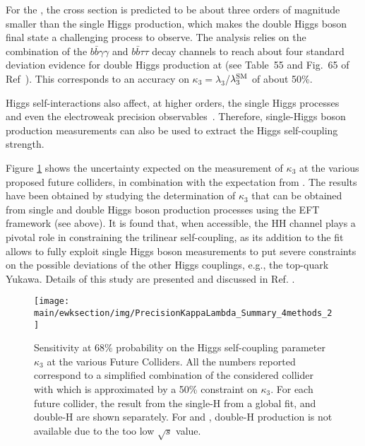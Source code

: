 \documentclass[../report.tex]{subfiles}
\providecommand{\main}{..}
\newcommand{\ew}{electroweak\xspace}
\begin{document}
For the \HLLHC, the cross section is predicted to be about three orders of magnitude smaller than the single Higgs production, which makes the double Higgs boson final state a challenging process to observe. The analysis relies on the combination of the $b\bar{b}\gamma\gamma$ and $b\bar{b}\tau\tau$ decay channels to reach about four standard deviation evidence for double Higgs production at \HLLHC (see Table~55 and Fig.~65 of Ref~\cite{Cepeda:2019klc}). This corresponds to an accuracy on $\kappa_3 = \lambda_3$/$\lambda_3^{\rm SM}$ of about 50\%.

Higgs self-interactions also affect, at higher orders, the single Higgs processes~\cite{McCullough:2013rea,Degrassi:2016wml,Bizon:2016wgr}  and even the \ew precision observables~\cite{vanderBij:1985ww, Degrassi:2017ucl, Kribs:2017znd}. Therefore, single-Higgs boson production measurements can also be used to extract the Higgs self-coupling strength.

Figure \ref{fig:h3-summary} shows the uncertainty expected on the measurement of $\kappa_3$ at the various proposed future colliders, in combination with the expectation from \HLLHC. The results have been obtained by studying the determination of $\kappa_3$ that can be obtained from single and double Higgs boson production processes using the EFT framework (see above). It is found that, when accessible, the HH channel plays a pivotal role in constraining the trilinear self-coupling, as its addition to the fit allows to fully exploit single Higgs boson measurements to put severe constraints on the possible deviations of the other Higgs couplings, e.g.,  the top-quark Yukawa.  Details of this study are presented and discussed in Ref. \cite{deBlas:2019rxi}.

\begin{figure}[!ht]
\centering
\texttt{[image: \\main/ewksection/img/PrecisionKappaLambda\_Summary\_4methods\_2]}
\caption{\label{fig:h3-summary}
Sensitivity at 68\% probability on the Higgs self-coupling parameter $\kappa_3$ at the various Future Colliders. All the numbers reported correspond to a simplified combination of the considered collider with \HLLHC which is approximated by a 50\% constraint on $\kappa_3$.
For each future collider, the result from the single-H from a global fit, and double-H are shown separately.
For \FCCee and \CEPC, double-H production is not available due to the too low $\sqrt{s}$ value.
}
\end{figure}
\end{document}
